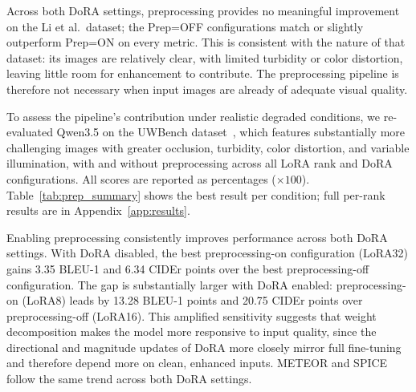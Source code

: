 Across both DoRA settings, preprocessing provides no meaningful improvement on the Li et al.\ dataset; the Prep=OFF configurations match or slightly outperform Prep=ON on every metric. This is consistent with the nature of that dataset: its images are relatively clear, with limited turbidity or color distortion, leaving little room for enhancement to contribute. The preprocessing pipeline is therefore not necessary when input images are already of adequate visual quality.

To assess the pipeline's contribution under realistic degraded conditions, we re-evaluated Qwen3.5 on the UWBench dataset~\cite{uwbench}, which features substantially more challenging images with greater occlusion, turbidity, color distortion, and variable illumination, with and without preprocessing across all LoRA rank and DoRA configurations. All scores are reported as percentages ($\times 100$). Table~\ref{tab:prep_summary} shows the best result per condition; full per-rank results are in Appendix~\ref{app:results}.

\begin{table}[h!]
\centering
\caption[Preprocessing ablation on the UWBench dataset (Qwen3.5)]{Preprocessing ablation on the UWBench dataset (Qwen3.5, best LoRA rank per condition)}
\label{tab:prep_summary}
\end{table}

Enabling preprocessing consistently improves performance across both DoRA settings. With DoRA disabled, the best preprocessing-on configuration (LoRA32) gains 3.35 BLEU-1 and 6.34 CIDEr points over the best preprocessing-off configuration. The gap is substantially larger with DoRA enabled: preprocessing-on (LoRA8) leads by 13.28 BLEU-1 points and 20.75 CIDEr points over preprocessing-off (LoRA16). This amplified sensitivity suggests that weight decomposition makes the model more responsive to input quality, since the directional and magnitude updates of DoRA more closely mirror full fine-tuning and therefore depend more on clean, enhanced inputs. METEOR and SPICE follow the same trend across both DoRA settings.


